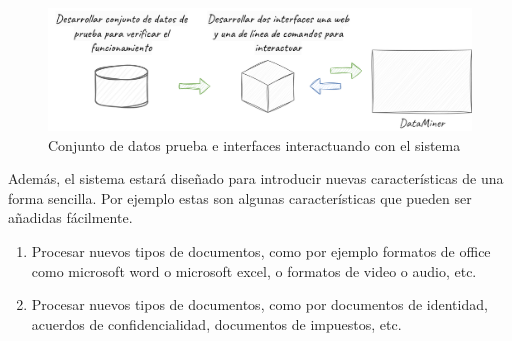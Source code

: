 \begin{figure}[ht]
    \begin{center}
        \includegraphics[width=\textwidth]{chapter/1/images/chapter_1.specific_b}
        \caption{Conjunto de datos prueba e interfaces interactuando con el sistema}
        \label{fig:chapter_1.specific_b}
    \end{center}
\end{figure}

Además, el sistema estará diseñado para introducir nuevas características de una forma sencilla.
Por ejemplo estas son algunas características que pueden ser añadidas fácilmente.

\begin{enumerate}
    \item
    Procesar nuevos tipos de documentos, como por ejemplo formatos de office como microsoft word o microsoft excel,
    o formatos de video o audio, etc.
    \item
    Procesar nuevos tipos de documentos, como por documentos de identidad, acuerdos de confidencialidad, documentos
    de impuestos, etc.
\end{enumerate}
